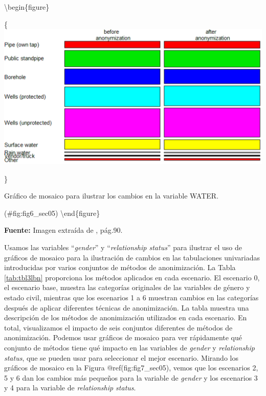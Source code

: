 \documentclass[]{book}
\theoremstyle{definition}
\theoremstyle{definition}
\theoremstyle{definition}
\theoremstyle{definition}
\theoremstyle{remark}
\begin{document}
\textbackslash{}begin\{figure\}

\{\centering \includegraphics[width=0.9\linewidth]{Imagenes/fig6}

\}

\caption{Gráfico de mosaico para ilustrar los cambios en la variable WATER.}

(\#fig:fig6\_sec05)
\textbackslash{}end\{figure\}

\textbf{Fuente:} Imagen extraída de \citep{benschop2021}, pág.90.

Usamos las variables ``\emph{gender}'' y ``\emph{relationship status}'' para ilustrar el uso de gráficos de mosaico para la ilustración de cambios en las tabulaciones univariadas introducidas por varios conjuntos de métodos de anonimización. La Tabla \ref{tab:tbl3lbn} proporciona los métodos aplicados en cada escenario. El escenario 0, el escenario base, muestra las categorías originales de las variables de género y estado civil, mientras que los escenarios 1 a 6 muestran cambios en las categorías después de aplicar diferentes técnicas de anonimización. La tabla muestra una descripción de los métodos de anonimización utilizados en cada escenario. En total, visualizamos el impacto de seis conjuntos diferentes de métodos de anonimización. Podemos usar gráficos de mosaico para ver rápidamente qué conjunto de métodos tiene qué impacto en las variables de \emph{gender} y \emph{relationship status}, que se pueden usar para seleccionar el mejor escenario. Mirando los gráficos de mosaico en la Figura @ref(fig:fig7\_sec05), vemos que los escenarios 2, 5 y 6 dan los cambios más pequeños para la variable de \emph{gender} y los escenarios 3 y 4 para la variable de \emph{relationship status}.
\end{document}
